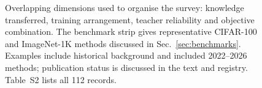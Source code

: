 \begin{figure}[htbp]
\centering

\caption{Overlapping dimensions used to organise the survey: knowledge transferred, training arrangement, teacher reliability and objective combination. The benchmark strip gives representative CIFAR-100 and ImageNet-1K methods discussed in Sec.~\ref{sec:benchmarks}. Examples include historical background and included 2022--2026 methods; publication status is discussed in the text and registry. Table~S2 lists all 112 records.}
\label{fig:taxonomy}
\end{figure}
